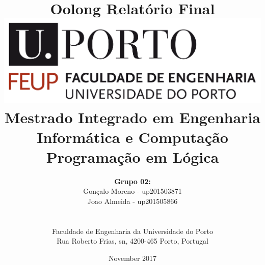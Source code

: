 \documentclass[a4paper]{article}
\begin{document}
\setlength{\textwidth}{16cm}
\setlength{\textheight}{22cm}

\title{\Huge\textbf{Oolong}\linebreak\linebreak\linebreak
\Large\textbf{Relatório Final}\linebreak\linebreak
\linebreak\linebreak
\includegraphics[scale=0.1]{feup-logo.png}\linebreak\linebreak
\linebreak\linebreak
\Large{Mestrado Integrado em Engenharia Informática e Computação} \linebreak\linebreak
\Large{Programação em Lógica}\linebreak
}

\author{\textbf{Grupo 02:}\\ Gonçalo Moreno - up201503871 \\ Joao Almeida - up201505866 \\\linebreak\linebreak \\
 \\ Faculdade de Engenharia da Universidade do Porto \\ Rua Roberto Frias, s\/n, 4200-465 Porto, Portugal \linebreak\linebreak\linebreak
\linebreak\linebreak\vspace{1cm}}
\date{November 2017}
\maketitle
\thispagestyle{empty}

\tableofcontents
\end{document}
